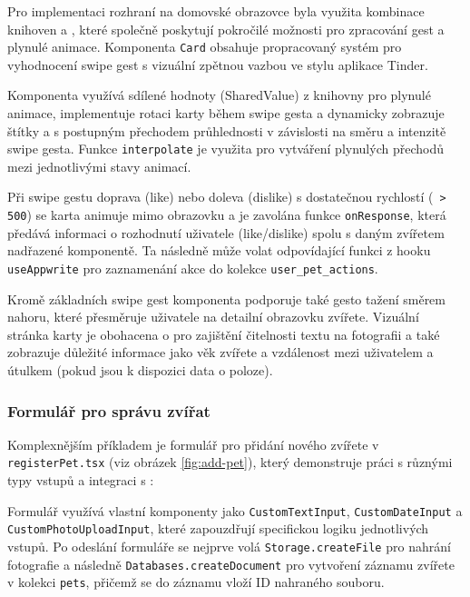 \documentclass[czech, bp, kiv, he, iso690numb, pdf]{fasthesis}
\begin{document}
    Pro implementaci  rozhraní na domovské obrazovce byla využita kombinace knihoven  a , které společně poskytují pokročilé možnosti pro zpracování gest a plynulé animace. Komponenta \texttt{Card} obsahuje propracovaný systém pro vyhodnocení swipe gest s vizuální zpětnou vazbou ve stylu aplikace Tinder.

    Komponenta využívá sdílené hodnoty (SharedValue) z knihovny  pro plynulé animace, implementuje rotaci karty během swipe gesta a dynamicky zobrazuje štítky  a  s postupným přechodem průhlednosti v závislosti na směru a intenzitě swipe gesta. Funkce \texttt{interpolate} je využita pro vytváření plynulých přechodů mezi jednotlivými stavy animací.

    Při swipe gestu doprava (like) nebo doleva (dislike) s dostatečnou rychlostí (\texttt{ > 500}) se karta animuje mimo obrazovku a je zavolána funkce \texttt{onResponse}, která předává informaci o rozhodnutí uživatele (like/dislike) spolu s daným zvířetem nadřazené komponentě. Ta následně může volat odpovídající funkci z hooku \texttt{useAppwrite} pro zaznamenání akce do kolekce \texttt{user\_pet\_actions}.

    Kromě základních swipe gest komponenta podporuje také gesto tažení směrem nahoru, které přesměruje uživatele na detailní obrazovku zvířete. Vizuální stránka karty je obohacena o  pro zajištění čitelnosti textu na fotografii a také zobrazuje důležité informace jako věk zvířete a vzdálenost mezi uživatelem a útulkem (pokud jsou k dispozici data o poloze).


    \subsubsection*{Formulář pro správu zvířat}

    Komplexnějším příkladem je formulář pro přidání nového zvířete v \texttt{registerPet.tsx} (viz obrázek \ref{fig:add-pet}), který demonstruje práci s různými typy vstupů a integraci s :


    Formulář využívá vlastní komponenty jako \texttt{CustomTextInput}, \texttt{CustomDateInput} a \texttt{CustomPhotoUploadInput}, které zapouzdřují specifickou logiku jednotlivých vstupů. Po odeslání formuláře se nejprve volá \texttt{Storage.createFile} pro nahrání fotografie a následně \texttt{Databases.createDocument} pro vytvoření záznamu zvířete v kolekci \texttt{pets}, přičemž se do záznamu vloží ID nahraného souboru.
\end{document}
